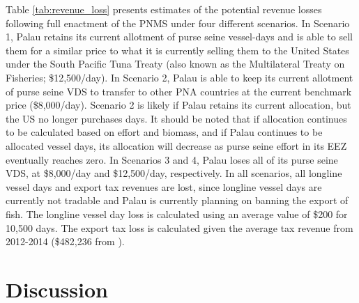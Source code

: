 \documentclass[12pt]{article}
\begin{document}
Table \ref{tab:revenue_loss} presents estimates of the potential revenue losses following full enactment of the PNMS under four different scenarios. In Scenario 1, Palau retains its current allotment of purse seine vessel-days and is able to sell them for a similar price to what it is currently selling them to the United States under the South Pacific Tuna Treaty (also known as the Multilateral Treaty on Fisheries; \$12,500/day). In Scenario 2, Palau is able to keep its current allotment of purse seine VDS to transfer to other PNA countries at the current benchmark price (\$8,000/day). Scenario 2 is likely if Palau retains its current allocation, but the US no longer purchases days. It should be noted that if allocation continues to be calculated based on effort and biomass, and if Palau continues to be allocated vessel days, its allocation will decrease as purse seine effort in its EEZ eventually reaches zero. In Scenarios 3 and 4, Palau loses all of its purse seine VDS, at \$8,000/day and \$12,500/day, respectively. In all scenarios, all longline vessel days and export tax revenues are lost, since longline vessel days are currently not tradable and Palau is currently planning on banning the export of fish. The longline vessel day loss is calculated using an average value of \$200 for 10,500 days. The export tax loss is calculated given the average tax revenue from 2012-2014 (\$482,236  from \cite{Gillett2016}).




\clearpage

\section{Discussion}
\end{document}
